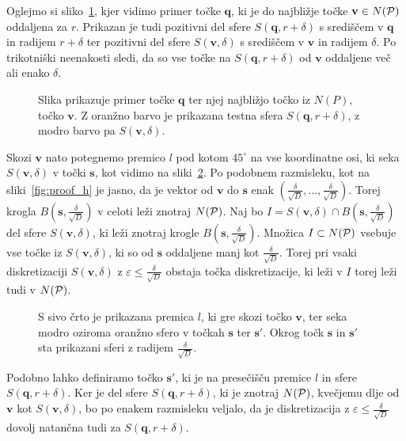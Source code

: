 \begin{dokaz}
Oglejmo si sliko~\ref{fig:determining-epsilon1}, kjer vidimo primer točke $\textbf{q}$, ki je do najbližje točke $\textbf{v} \in N(\P)$ oddaljena za $r$. Prikazan je tudi pozitivni del sfere $S(\textbf{q}, r + \delta)$ s središčem v $\textbf{q}$ in radijem $r + \delta$ ter pozitivni del sfere $S(\textbf{v}, \delta)$ s središčem v $\textbf{v}$ in radijem $\delta$. Po trikotniški neenakosti sledi, da so vse točke na $S(\textbf{q}, r + \delta)$ od $\textbf{v}$ oddaljene več ali enako $\delta$. 
\begin{figure}[ht]
  \centering
  
  \caption{Slika prikazuje primer točke $\textbf{q}$ ter njej najbližjo točko iz $N(P)$, točko $\textbf{v}$. Z oranžno barvo je prikazana testna sfera  $S(\textbf{q}, r + \delta)$, z modro barvo pa $S(\textbf{v}, \delta)$.}
  \label{fig:determining-epsilon1}
\end{figure}

Skozi $\textbf{v}$ nato potegnemo premico $l$ pod kotom $45^\circ$ na vse koordinatne osi, ki seka $S(\textbf{v}, \delta)$ v točki $\textbf{s}$, kot vidimo na sliki~\ref{fig:determining-epsilon2}. Po podobnem razmisleku, kot na sliki~\ref{fig:proof_h} je jasno, da je vektor od $\textbf{v}$ do $\textbf{s}$ enak $(\frac{\delta}{\sqrt{D}}, \dots, \frac{\delta}{\sqrt{D}})$. Torej krogla $B(\textbf{s}, \frac{\delta}{\sqrt{D}})$ v celoti leži znotraj $N(\P)$. Naj bo $I = S(\textbf{v}, \delta) \cap B(\textbf{s}, \frac{\delta}{\sqrt{D}})$ del sfere $S(\textbf{v}, \delta)$, ki leži znotraj krogle $B(\textbf{s}, \frac{\delta}{\sqrt{D}})$. Množica $I \subset N(\P)$ vsebuje vse točke iz $S(\textbf{v}, \delta)$, ki so od $\textbf{s}$ oddaljene manj kot $\frac{\delta}{\sqrt{D}}$. Torej pri vsaki diskretizaciji $S(\textbf{v}, \delta)$ z $\varepsilon \leq \frac{\delta}{\sqrt{D}}$ obstaja točka diskretizacije, ki leži v $I$ torej leži tudi v $N(\P)$.
\begin{figure}[ht]
  \centering
  
  \caption{S sivo črto je prikazana premica $l$, ki gre skozi točko $\textbf{v}$, ter seka modro oziroma oranžno sfero v točkah $\textbf{s}$ ter $\textbf{s}'$. Okrog točk $\textbf{s}$ in $\textbf{s}'$ sta prikazani sferi z radijem $\frac{\delta}{\sqrt{D}}$.}
  \label{fig:determining-epsilon2}
\end{figure}

Podobno lahko definiramo točko $\textbf{s}'$, ki je na presečišču premice $l$ in sfere $S(\textbf{q}, r + \delta)$. Ker je del sfere $S(\textbf{q}, r + \delta)$, ki je znotraj $N(\P)$, kvečjemu dlje od $\textbf{v}$ kot $S(\textbf{v}, \delta)$, bo po enakem razmisleku veljalo, da je diskretizacija z $\varepsilon \leq \frac{\delta}{\sqrt{D}}$ dovolj natančna tudi za $S(\textbf{q}, r + \delta)$.

\end{dokaz}


